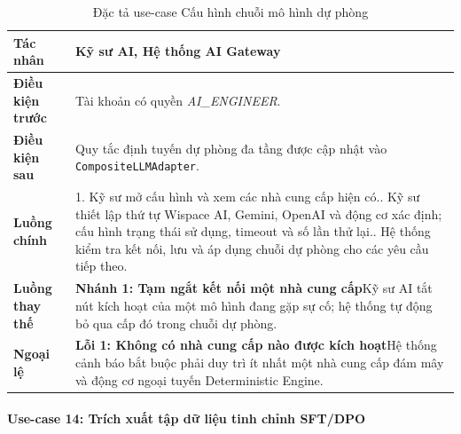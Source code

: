 \begingroup
\small
\begin{longtable}{|p{3.2cm}|p{\dimexpr\linewidth-3.2cm-4\tabcolsep-3\arrayrulewidth\relax}|}
\caption{Đặc tả use-case Cấu hình chuỗi mô hình dự phòng}
\label{aihub:tab:uc_config_fallback}\\
\hline
\textbf{Tác nhân} & Kỹ sư AI, Hệ thống AI Gateway \\ \hline
\textbf{Điều kiện trước} & Tài khoản có quyền \textit{AI\_ENGINEER}. \\ \hline
\textbf{Điều kiện sau} & Quy tắc định tuyến dự phòng đa tầng được cập nhật vào \texttt{CompositeLLMAdapter}. \\ \hline
\textbf{Luồng chính} & 1. Kỹ sư mở cấu hình và xem các nhà cung cấp hiện có.\newline 2. Kỹ sư thiết lập thứ tự Wispace AI, Gemini, OpenAI và động cơ xác định; cấu hình trạng thái sử dụng, timeout và số lần thử lại.\newline 3. Hệ thống kiểm tra kết nối, lưu và áp dụng chuỗi dự phòng cho các yêu cầu tiếp theo. \\ \hline
\textbf{Luồng thay thế} &
\textbf{Nhánh 1: Tạm ngắt kết nối một nhà cung cấp}\newline Kỹ sư AI tắt nút kích hoạt của một mô hình đang gặp sự cố; hệ thống tự động bỏ qua cấp đó trong chuỗi dự phòng. \\ \hline
\textbf{Ngoại lệ} &
\textbf{Lỗi 1: Không có nhà cung cấp nào được kích hoạt}\newline Hệ thống cảnh báo bắt buộc phải duy trì ít nhất một nhà cung cấp đám mây và động cơ ngoại tuyến Deterministic Engine. \\ \hline
\end{longtable}
\endgroup

\paragraph{Use-case 14: Trích xuất tập dữ liệu tinh chỉnh SFT/DPO}

